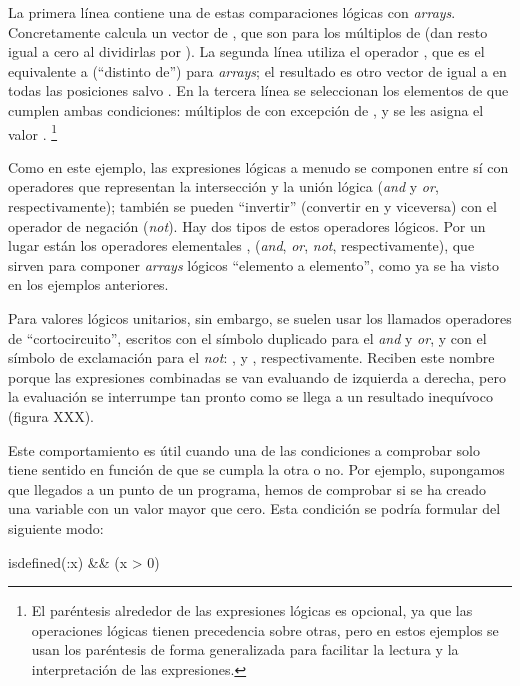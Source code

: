La primera línea contiene una de estas comparaciones lógicas con \emph{arrays}. Concretamente calcula un vector de , que son  para los múltiplos de  (dan resto igual a cero al dividirlas por ). La segunda línea utiliza el operador \code{~=}, que es el equivalente a \code{!=} (``distinto de'') para \emph{arrays}; el resultado es otro vector de  igual a  en todas las posiciones salvo . En la tercera línea se seleccionan los elementos de  que cumplen ambas condiciones: múltiplos de  con excepción de , y se les asigna el valor .%
\footnote{%
El paréntesis alrededor de las expresiones lógicas es opcional, ya que las operaciones lógicas tienen precedencia sobre otras, pero en estos ejemplos se usan los paréntesis de forma generalizada para facilitar la lectura y la interpretación de las expresiones.%
}

Como en este ejemplo, las expresiones lógicas a menudo se componen entre sí con operadores que representan la intersección y la unión lógica (\emph{and} y \emph{or}, respectivamente); también se pueden ``invertir'' (convertir  en  y viceversa) con el operador de negación (\emph{not}). Hay dos tipos de estos operadores lógicos. Por un lugar están los operadores elementales \code{&} \code{|}, \code{~} (\emph{and}, \emph{or}, \emph{not}, respectivamente), que sirven para componer \emph{arrays} lógicos ``elemento a elemento'', como ya se ha visto en los ejemplos anteriores.

Para valores lógicos unitarios, sin embargo, se suelen usar los llamados operadores de ``cortocircuito'', escritos con el símbolo duplicado para el \emph{and} y \emph{or}, y con el símbolo de exclamación para el \emph{not}: \code{&&}, \code{||} y \code{!}, respectivamente. Reciben este nombre porque las expresiones combinadas se van evaluando de izquierda a derecha, pero la evaluación se interrumpe tan pronto como se llega a un resultado inequívoco (figura XXX).

Este comportamiento es útil cuando una de las condiciones a comprobar solo tiene sentido en función de que se cumpla la otra o no. Por ejemplo, supongamos que llegados a un punto de un programa, hemos de comprobar si se ha creado una variable  con un valor mayor que cero. Esta condición se podría formular del siguiente modo:

\begin{juliacode}
isdefined(:x) && (x > 0)
\end{juliacode}


